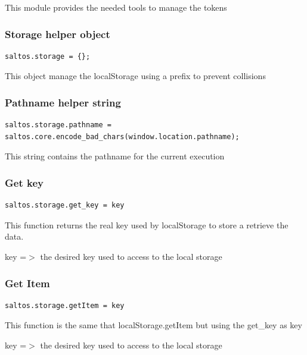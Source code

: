 \documentclass[a4paper]{article}
\begin{document}
This module provides the needed tools to manage the tokens

\hypertarget{toc287}{}
\subsubsection{Storage helper object}

\begin{lstlisting}
saltos.storage = {};
\end{lstlisting}

This object manage the localStorage using a prefix to prevent collisions

\hypertarget{toc288}{}
\subsubsection{Pathname helper string}

\begin{lstlisting}
saltos.storage.pathname = saltos.core.encode_bad_chars(window.location.pathname);
\end{lstlisting}

This string contains the pathname for the current execution

\hypertarget{toc289}{}
\subsubsection{Get key}

\begin{lstlisting}
saltos.storage.get_key = key
\end{lstlisting}

This function returns the real key used by localStorage to store a retrieve
the data.

key =$>$ the desired key used to access to the local storage

\hypertarget{toc290}{}
\subsubsection{Get Item}

\begin{lstlisting}
saltos.storage.getItem = key
\end{lstlisting}

This function is the same that localStorage.getItem but using the get\_key as key

key =$>$ the desired key used to access to the local storage

\hypertarget{toc291}{}
\end{document}
